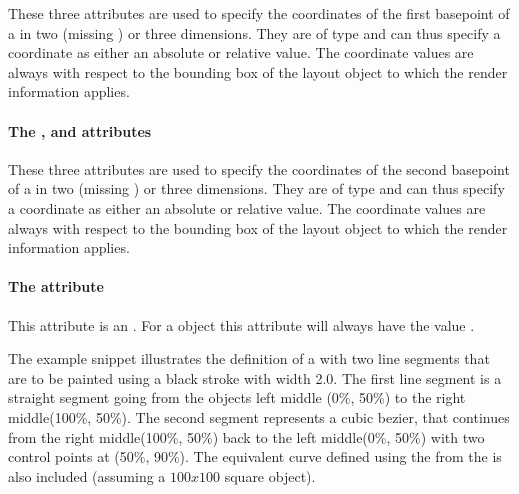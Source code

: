 These three attributes are used to specify the coordinates of the first basepoint of a \RenderCubicBezier in two (missing ) or three dimensions. They are of type \RelAbsVector and can thus specify a coordinate as either an absolute or relative value. The coordinate
values are always with respect to the bounding box of the layout object to which the
render information applies.


\paragraph{The \fixttspace{}, \fixttspace{} and \fixttspace{} attributes}

These three attributes are used to specify the coordinates of the second basepoint of a \RenderCubicBezier in two (missing ) or three dimensions. They are of type \RelAbsVector and can thus specify a coordinate as either an absolute or relative value. The coordinate
values are always with respect to the bounding box of the layout object to which the
render information applies.

\paragraph{The \fixttspace{} attribute}

This attribute is an . For a \RenderCubicBezier object this attribute will always have the value .



The example snippet illustrates the definition of a \RenderCurve with two line segments 
that are to be painted using a black stroke with width 2.0.
The first line segment is a straight segment going from the objects left middle (0\%, 50\%) 
to the right middle(100\%, 50\%). The second segment represents a cubic bezier, that 
continues from the right middle(100\%, 50\%) back to the left middle(0\%, 50\%) with 
two control points at (50\%, 90\%).  The equivalent curve defined using the  from the \LayoutPackage is also included (assuming a $100 x 100$ square object).


